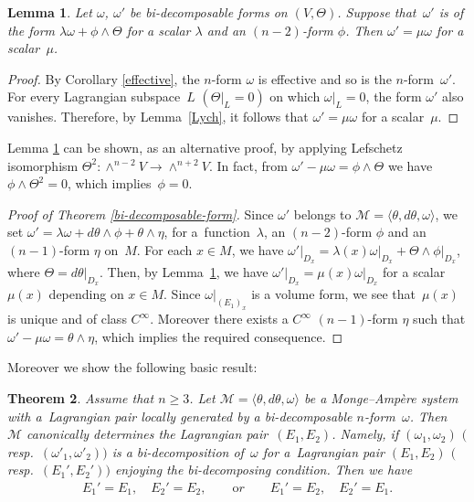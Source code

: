 \documentclass[pdftex]{sigma}
\newtheorem{Th}{Theorem}[section]
\newtheorem{Lem}[Th]{Lemma}
{ \theoremstyle{definition}
\newtheorem{Def}[Th]{Definition}
\newtheorem{Rem}[Th]{Remark}
\newtheorem{Ex}[Th]{Example}}
\begin{document}
\begin{Lem}
\label{bi-decomposable2}
Let $\omega$, ${\omega}'$ be bi-decomposable forms on $(V, \Theta)$.
Suppose that~${\omega}'$ is of the form
$\lambda \omega+\phi \wedge \Theta$
for a scalar $\lambda$ and an $(n-2)$-form $\phi$.
Then ${\omega}' = \mu\omega$ for a scalar~$\mu$.
\end{Lem}

\begin{proof}
By Corollary \ref{effective}, the $n$-form $\omega$ is ef\/fective
and so is the $n$-form~${\omega}'$.
For every Lagrangian subspace~$L$ $(\Theta\vert_L = 0)$ on which
$\omega\vert_L = 0$,
the form $\omega'$ also vanishes.
Therefore, by Lemma~\ref{Lych},
it follows that
$\omega' =\mu{\omega}$
for a scalar~$\mu$.
\end{proof}

\begin{Rem}
Lemma \ref{bi-decomposable2} can be shown, as an alternative proof, by
applying Lefschetz isomorphism $\Theta^2\colon
\wedge^{n-2} V \to \wedge^{n+2} V$. In fact, from ${\omega}' - \mu\omega = \phi \wedge \Theta$
we have $\phi\wedge \Theta^2 = 0$, which implies~$\phi = 0$.
\end{Rem}


\begin{proof}[Proof of Theorem \ref{bi-decomposable-form}]
Since $\omega'$ belongs to ${\mathcal M} = \langle \theta, d\theta, \omega
\rangle$,
we set $\omega' = \lambda\omega +  d\theta\wedge\phi + \theta\wedge \eta$,
for a~function~$\lambda$, an $(n-2)$-form $\phi$ and an $(n-1)$-form $\eta$
on~$M$.
For each $x \in M$, we have
$\omega'\vert_{D_x} = \lambda(x)\omega\vert_{D_x} +
\Theta\wedge\phi\vert_{D_x}$,
where $\Theta = d\theta\vert_{D_x}$.
Then, by Lemma~\ref{bi-decomposable2}, we have
$\omega'\vert_{D_x} = \mu(x)\omega\vert_{D_x}$ for a scalar~$\mu(x)$
depending on $x \in M$.
Since $\omega\vert_{(E_1)_x}$ is a volume form, we see that~$\mu(x)$
is unique and
of class $C^\infty$. Moreover there exists a $C^\infty$ $(n-1)$-form $\eta$
such that $\omega' - \mu\omega = \theta \wedge \eta$, which implies
the required consequence.
\end{proof}


Moreover we show the following basic result:
\begin{Th}\label{Uniqueness}
Assume that $n\geq 3$.
Let
$\mathcal{M}=
\langle \theta, d\theta, \omega \rangle$ be
a Monge--Amp{\`e}re system
with a~Lag\-rangian pair locally generated by a bi-decomposable
$n$-form~$\omega$. Then~$\mathcal{M}$
canonically determines the Lagrangian pair~$(E_1,E_2)$.
Namely, if $(\omega_1, \omega_2)$
$($resp.\ $(\omega'_1, \omega'_2))$
is a bi-decomposition of~$\omega$ for
a~Lag\-rangian pair $(E_1,E_2)$ $($resp.~$(E_1', E_2'))$
enjoying the bi-decomposing condition.
Then we have
\begin{gather*}
E_1'=E_1,\quad  E_2'=E_2, \qquad {\mathrm or} \qquad
E_1' = E_2, \quad  E_2' = E_1.
\end{gather*}
\end{Th}
\end{document}
